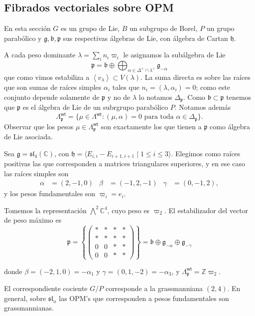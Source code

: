 \documentclass[11pt,fleqn]{article}
\newcommand\CC{\mathbb C}
\newcommand\ZZ{\mathbb Z}
\newcommand\gen[1]{\left\langle#1\right\rangle}
\newcommand\g{\mathfrak g}
\renewcommand\b{\mathfrak b}
\newcommand\h{\mathfrak h}
\newcommand\p{\mathfrak p}
\renewcommand\sl{\mathfrak{sl}}
\newcommand\wt{\mathsf{wt}}
\renewcommand\sl{\mathfrak{sl}}
\begin{document}
\subsection{Fibrados vectoriales sobre OPM}
En esta sección $G$ es un grupo de Lie, $B$ un subgrupo de Borel, $P$ un grupo parabólico y $\g, \b, \p$ sus respectivas álgebras de Lie, con álgebra de Cartan $\h$.

A cada peso dominante $\lambda = \sum_i n_i \varpi_i$ le asignamos la subálgebra de Lie
\[
	\p = \b \oplus \bigoplus_{\alpha \in \Delta^+ \cap \lambda^\perp} \g_{-\alpha}
\]
que como vimos estabiliza a $\gen{v_\lambda} \subset V(\lambda)$.
La suma directa es sobre las raíces que son sumas de raíces simples $\alpha_i$ tales que 
$n_i = (\lambda, \alpha_i) = 0$; como este conjunto depende solamente de $\p$ y no de 
$\lambda$ lo notamos $\Delta_\p$. Como $\b \subset \p$ tenemos que $\p$ es el álgebra de
Lie de un subrgrupo parabólico $P$. Notamos además
\[
	\Lambda^\wt_\p = \{\mu \in \Lambda^\wt : (\mu, \alpha) = 0 \mbox{ para toda } \alpha
	\in \Delta_\p\}.
\]
Observar que los pesos $\mu \in \Lambda^\wt_\p$ son exactamente los que tienen a $\p$
como álgebra de Lie asociada. 

\begin{Example}
\label{g24}
Sea $\g = \mathfrak{sl}_4(\CC)$, con $\h = \langle E_{i,i}- E_{i+1,i+1} \mid 1 \leq i
\leq 3\rangle$. Elegimos como raíces positivas las que corresponden a matrices
triangulares superiores, y en ese caso las raíces simples son
\begin{align*}
	\alpha &= (2,-1,0) & \beta &= (-1,2,-1) & \gamma &= (0,-1,2),
\end{align*}
y los pesos fundamentales son $\varpi_i = e_i$.

Tomemos la representación $\bigwedge^2 \CC^4$, cuyo peso es $\varpi_2$. El estabilizador
del vector de peso máximo es
\[
	\p = \left\{\begin{pmatrix} * & * & * &* \\ *&*&*&*\\ 0 & 0 &*&*
\\0&0&*&*\end{pmatrix}\right\} = \b \oplus \g_{-\alpha} \oplus \g_{-\gamma}
	\]
\end{Example}
donde $\beta = (-2,1,0) = - \alpha_1$ y $\gamma = (0,1,-2) = - \alpha_3$, y
$\Lambda_\p^\wt = \ZZ \varpi_2$.

El correspondiente cociente $G/P$ corresponde a la grassmanniana $(2,4)$. En general,
sobre $\sl_n$ las OPM's que corresponden a pesos fundamentales son grassmannianas.
\end{document}
